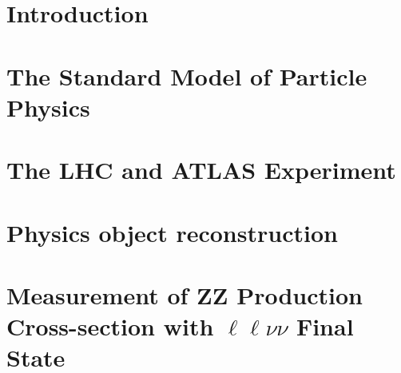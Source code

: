 \documentclass[degree=doctor,language=english]{ustcthesis}
\begin{document}
\maketitle

\declarationoforiginality

\declarationofaiusage[purpose=语言润色]


\frontmatter
% 

\tableofcontents
\listoffigures
\listoftables

% 


\mainmatter
\chapter{Introduction}
\label{chap:Intro}

\clearpage

\chapter{The Standard Model of Particle Physics}
\label{chap:theory}

\clearpage

\chapter{The LHC and ATLAS Experiment}
\label{chap:experiment}

\clearpage

\chapter{Physics object reconstruction}
\label{chap:recon}

\clearpage

\chapter{\texorpdfstring{Measurement of ZZ Production Cross-section with $\ell\ell\nu\nu$ Final State}{Measurement of ZZ Production with llnunu Final State}}
\label{chap:zz}

\clearpage
\end{document}

